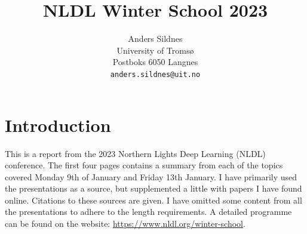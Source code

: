 \documentclass[10pt,twocolumn,letterpaper]{article}
\begin{document}
\title{NLDL Winter School 2023}

\author{Anders Sildnes\\
University of Tromsø\\
Postboks 6050 Langnes\\
{\tt\small anders.sildnes@uit.no}
}
\maketitle

\section{Introduction} \label{sec:intro}
This is a report from the 2023 Northern Lights Deep Learning (NLDL) conference. The first four pages contains a summary from each of the topics covered Monday 9th of January and Friday 13th January. I have primarily used the presentations as a source, but supplemented a little with papers I have found online. Citations to these sources are given. 
I have omitted some content from all the presentations to adhere to the length requirements. A detailed programme can be found on the website: \href{https://www.nldl.org/winter-school}{https://www.nldl.org/winter-school}. 
\end{document}
